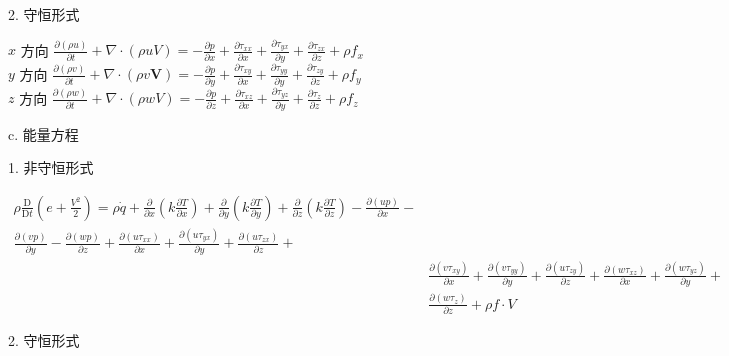 \documentclass[UTF8]{ctexart}
\begin{document}
2. 守恒形式

$x$ 方向 $\frac{\partial(\rho u)}{\partial t}+\nabla \cdot(\rho u V)=-\frac{\partial p}{\partial x}+\frac{\partial \tau_{x x}}{\partial x}+\frac{\partial \tau_{y x}}{\partial y}+\frac{\partial \tau_{z x}}{\partial z}+\rho f_{x}$  \\
$y$ 方向 $\frac{\partial(\rho v)}{\partial t}+\nabla \cdot(\rho v \boldsymbol{V})=-\frac{\partial p}{\partial y}+\frac{\partial \tau_{x y}}{\partial x}+\frac{\partial \tau_{y y}}{\partial y}+\frac{\partial \tau_{z y}}{\partial z}+\rho f_{y}$ \\
$z$ 方向 $\frac{\partial(\rho w)}{\partial t}+\nabla \cdot(\rho w V)=-\frac{\partial p}{\partial z}+\frac{\partial \tau_{x z}}{\partial x}+\frac{\partial \tau_{y z}}{\partial y}+\frac{\partial \tau_{z}}{\partial z}+\rho f_{z}$

c. 能量方程

1. 非守恒形式

$$
	\begin{gathered}
		\rho \frac{\mathrm{D}}{\mathrm{D} t}\left(e+\frac{V^{2}}{2}\right)=\rho \dot{q}+\frac{\partial}{\partial x}\left(k \frac{\partial T}{\partial x}\right)+\frac{\partial}{\partial y}\left(k \frac{\partial T}{\partial y}\right)+\frac{\partial}{\partial z}\left(k \frac{\partial T}{\partial z}\right)-\frac{\partial(u p)}{\partial x}- \\
		\frac{\partial(v p)}{\partial y}-\frac{\partial(w p)}{\partial z}+\frac{\partial\left(u \tau_{x x}\right)}{\partial x}+\frac{\partial\left(u \tau_{y x}\right)}{\partial y}+\frac{\partial\left(u \tau_{z x}\right)}{\partial z}+ \\
		& \frac{\partial\left(v \tau_{x y}\right)}{\partial x}+\frac{\partial\left(v \tau_{y y}\right)}{\partial y}+\frac{\partial\left(u \tau_{z y}\right)}{\partial z}+\frac{\partial\left(w \tau_{x z}\right)}{\partial x}+\frac{\partial\left(w \tau_{y z}\right)}{\partial y}+ \\
		& \frac{\partial\left(w \tau_{z}\right)}{\partial z}+\rho f \cdot V
	\end{gathered}
$$

2. 守恒形式
\end{document}

